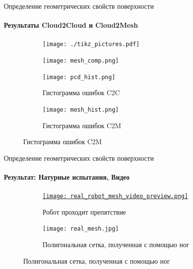 \begin{frame}[t]{Определение геометрических свойств поверхности}
    \framesubtitle{Результаты Cloud2Cloud и Cloud2Mesh}
    \begin{figure}[H]
        \begin{subfigure}[t]{0.49\textwidth}
            \centering\texttt{[image: ./tikz\_pictures.pdf]}
        \end{subfigure}
        \begin{subfigure}[t]{0.49\textwidth}
            \centering\texttt{[image: mesh\_comp.png]}
        \end{subfigure}

        \begin{subfigure}[t]{0.49\textwidth}
            \centering\texttt{[image: pcd\_hist.png]}
            \caption*{Гистограмма ошибок C2C}
        \end{subfigure}
        \begin{subfigure}[t]{0.49\textwidth}
            \centering\texttt{[image: mesh\_hist.png]}
            \caption*{Гистограмма ошибок C2M}
        \end{subfigure}
    \end{figure}
\end{frame}


\begin{frame}[t]{Определение геометрических свойств поверхности}
    \framesubtitle{Результат: Натурные испытания, Видео}
    \vspace{-0.5cm}
    \begin{figure}[H]
        \begin{subfigure}[t]{0.49\textwidth}
            \href{https://youtu.be/2dxHHTG4psQ}{
                \centering\texttt{[image: real\_robot\_mesh\_video\_preview.png]}}
            \caption*{Робот проходит препятствие}
        \end{subfigure}
        \begin{subfigure}[t]{0.49\textwidth}
            \centering\texttt{[image: real\_mesh.jpg]}
            \caption*{Полигональная сетка, полученная с помощью ног}
        \end{subfigure}
    \end{figure}
\end{frame}

